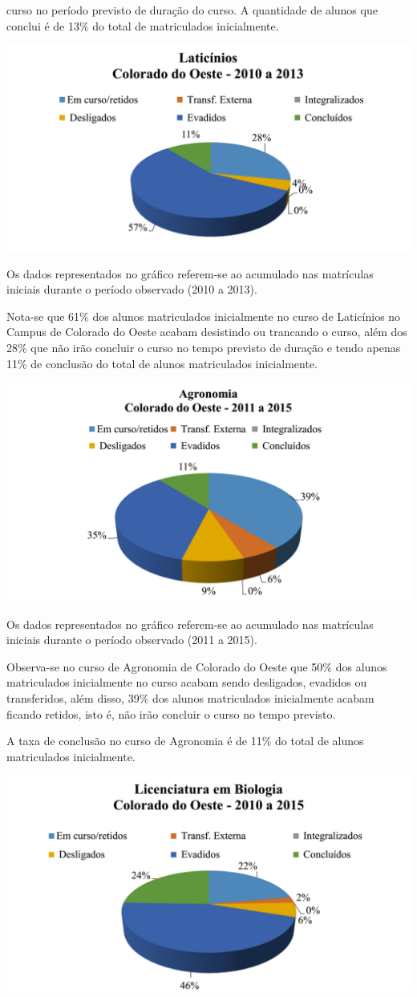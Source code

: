 \documentclass[article,12pt,onesidea,4paper,english,brazil]{abntex2}
\begin{document}
	curso no período previsto de duração do curso.
	A quantidade de alunos que conclui é de 13\% do total de matriculados inicialmente.
	\begin{center}
		\includegraphics[width=0.7\linewidth]{pip-97-8}
	\end{center}
	
	Os dados representados no gráfico referem-se ao acumulado nas matrículas iniciais durante
	o período observado (2010 a 2013).
	
	Nota-se que 61\% dos alunos matriculados inicialmente no curso de Laticínios no Campus
	de Colorado do Oeste acabam desistindo ou trancando o curso, além dos 28\% que não irão
	concluir o curso no tempo previsto de duração e tendo apenas 11\% de conclusão do total de
	alunos matriculados inicialmente.
	\begin{center}
		\includegraphics[width=0.7\linewidth]{pip-97-9}
	\end{center}
	
	Os dados representados no gráfico referem-se ao acumulado nas matrículas iniciais durante
	o período observado (2011 a 2015).
	
	Observa-se no curso de Agronomia de Colorado do Oeste que 50\% dos alunos matriculados
	inicialmente no curso acabam sendo desligados, evadidos ou transferidos, além disso, 39\% dos
	alunos matriculados inicialmente acabam ficando retidos, isto é, não irão concluir o curso no
	tempo previsto.
	
	A taxa de conclusão no curso de Agronomia é de 11\% do total de alunos matriculados
	inicialmente.
	\begin{center}
		\includegraphics[width=0.7\linewidth]{pip-97-10}
	\end{center}
	
\end{document}
